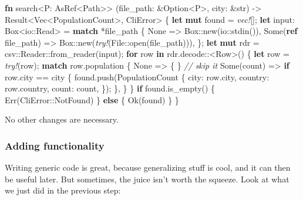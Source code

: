 \documentclass[a4paper,]{book}
\renewcommand*{\hypertarget}[3][\ar]{%
  \def\ar{#2}%
  \label{#1}%
  #3}
\newenvironment{Shaded}{\begin{snugshade}}{\end{snugshade}}
\newcommand{\KeywordTok}[1]{\textcolor[rgb]{0.13,0.29,0.53}{\textbf{{#1}}}}
\newcommand{\DataTypeTok}[1]{\textcolor[rgb]{0.13,0.29,0.53}{{#1}}}
\newcommand{\ConstantTok}[1]{\textcolor[rgb]{0.00,0.00,0.00}{{#1}}}
\newcommand{\CommentTok}[1]{\textcolor[rgb]{0.56,0.35,0.01}{\textit{{#1}}}}
\newcommand{\PreprocessorTok}[1]{\textcolor[rgb]{0.56,0.35,0.01}{\textit{{#1}}}}
\newcommand{\NormalTok}[1]{{#1}}
\begin{document}
\begin{Shaded}
\begin{Highlighting}[]
\KeywordTok{fn} \NormalTok{search<P: AsRef<Path>>}
         \NormalTok{(file_path: &}\DataTypeTok{Option}\NormalTok{<P>, city: &}\DataTypeTok{str}\NormalTok{)}
         \NormalTok{-> }\DataTypeTok{Result}\NormalTok{<}\DataTypeTok{Vec}\NormalTok{<PopulationCount>, CliError> \{}
    \KeywordTok{let} \KeywordTok{mut} \NormalTok{found = }\PreprocessorTok{vec!}\NormalTok{[];}
    \KeywordTok{let} \NormalTok{input: }\DataTypeTok{Box}\NormalTok{<io::Read> = }\KeywordTok{match} \NormalTok{*file_path \{}
        \ConstantTok{None} \NormalTok{=> }\DataTypeTok{Box}\NormalTok{::new(io::stdin()),}
        \ConstantTok{Some}\NormalTok{(}\KeywordTok{ref} \NormalTok{file_path) => }\DataTypeTok{Box}\NormalTok{::new(}\PreprocessorTok{try!}\NormalTok{(File::open(file_path))),}
    \NormalTok{\};}
    \KeywordTok{let} \KeywordTok{mut} \NormalTok{rdr = csv::Reader::from_reader(input);}
    \KeywordTok{for} \NormalTok{row }\KeywordTok{in} \NormalTok{rdr.decode::<Row>() \{}
        \KeywordTok{let} \NormalTok{row = }\PreprocessorTok{try!}\NormalTok{(row);}
        \KeywordTok{match} \NormalTok{row.population \{}
            \ConstantTok{None} \NormalTok{=> \{ \} }\CommentTok{// skip it}
            \ConstantTok{Some}\NormalTok{(count) => }\KeywordTok{if} \NormalTok{row.city == city \{}
                \NormalTok{found.push(PopulationCount \{}
                    \NormalTok{city: row.city,}
                    \NormalTok{country: row.country,}
                    \NormalTok{count: count,}
                \NormalTok{\});}
            \NormalTok{\},}
        \NormalTok{\}}
    \NormalTok{\}}
    \KeywordTok{if} \NormalTok{found.is_empty() \{}
        \ConstantTok{Err}\NormalTok{(CliError::NotFound)}
    \NormalTok{\} }\KeywordTok{else} \NormalTok{\{}
        \ConstantTok{Ok}\NormalTok{(found)}
    \NormalTok{\}}
\NormalTok{\}}
\end{Highlighting}
\end{Shaded}

No other changes are necessary.

\hypertarget{adding-functionality}{\subsubsection{Adding
functionality}\label{adding-functionality}}

Writing generic code is great, because generalizing stuff is cool, and
it can then be useful later. But sometimes, the juice isn't worth the
squeeze. Look at what we just did in the previous step:
\end{document}
